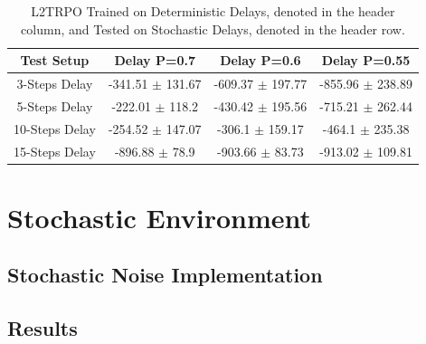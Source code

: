             \begin{table}[t]
                \centering
                \begin{tabular}{@{}cccc@{}}
                \toprule
                \multicolumn{1}{c}{Test Setup} & Delay P=0.7           & Delay P=0.6          & Delay P=0.55         \\ \midrule
                3-Steps Delay                  & -341.51 $\pm$ 131.67  & -609.37 $\pm$ 197.77 & -855.96 $\pm$ 238.89 \\
                5-Steps Delay                  & -222.01 $\pm$ 118.2   & -430.42 $\pm$ 195.56 & -715.21 $\pm$ 262.44 \\
                10-Steps Delay                 & -254.52 $\pm$ 147.07  & -306.1  $\pm$ 159.17 & -464.1  $\pm$ 235.38 \\
                15-Steps Delay                 & -896.88 $\pm$ 78.9    & -903.66 $\pm$ 83.73  & -913.02 $\pm$ 109.81 \\ \bottomrule
                \end{tabular}
                \centering
                \caption{L2TRPO Trained on Deterministic Delays, denoted in the header column, and Tested on Stochastic Delays, denoted in the header row.}
            \end{table}
            
    \newpage
    \section{Stochastic Environment}
    \label{results:stochastic}
        
        \subsection{Stochastic Noise Implementation}
        
        \subsection{Results}
